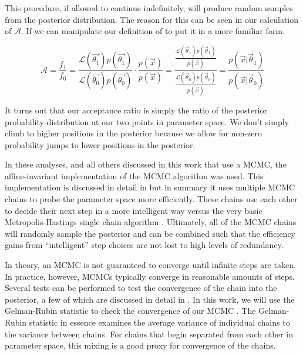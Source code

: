 This procedure, if allowed to continue indefinitely, will produce random samples from the posterior distribution.  The reason for this can be seen in our calculation of $\mathcal{A}$.  If we can manipulate our definition of to put it in a more familiar form.

\begin{equation}
        \mathcal{A} = \frac{f_1}{f_0} = \frac{\mathcal{L}(\vec{\theta_1}) p(\vec{\theta_1})}{\mathcal{L}(\vec{\theta_0}) p(\vec{\theta_0})} \cdot \frac{p(\vec{x})}{p(\vec{x})} = \frac{\frac{\mathcal{L}(\vec{\theta}_1) p(\vec{\theta}_1)}{p(\vec{x})}}{\frac{\mathcal{L}(\vec{\theta}_0) p(\vec{\theta}_0)}{p(\vec{x})}} = \frac{p(\vec{x}|\vec{\theta}_1)}{p(\vec{x}|\vec{\theta}_0)}
\end{equation}

It turns out that our acceptance ratio is simply the ratio of the posterior probability distribution at our two points in parameter space.  We don't simply climb to higher positions in the posterior because we allow for non-zero probability jumps to lower positions in the posterior.

In these analyses, and all others discussed in this work that use a MCMC, the affine-invariant implementation of the MCMC algorithm was used.  This implementation is discussed in detail in  but in summary it uses multiple MCMC chains to probe the parameter space more efficiently.  These chains use each other to decide their next step in a more intelligent way versus the very basic Metropolis-Hastings single chain algorithm \cite{chib1995understanding}.  Ultimately, all of the MCMC chains will randomly sample the posterior and can be combined such that the efficiency gains from ``intelligent'' step choices are not lost to high levels of redundancy.

In theory, an MCMC is not guaranteed to converge until infinite steps are taken.  In practice, however, MCMCs typically converge in reasonable amounts of steps.  Several tests can be performed to test the convergence of the chain into the posterior, a few of which are discussed in detail in .  In this work, we will use the Gelman-Rubin statistic to check the convergence of our MCMC \cite{gelman1992inference}.  The Gelman-Rubin statistic in essence examines the average variance of individual chains to the variance between chains.  For chains that begin separated from each other in parameter space, this mixing is a good proxy for convergence of the chains.


